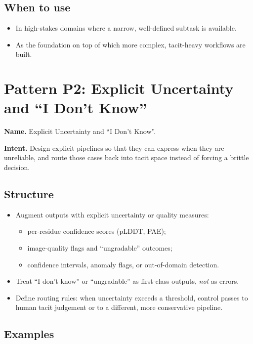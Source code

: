 \subsection*{When to use}

\begin{itemize}
  \item In high-stakes domains where a narrow, well-defined subtask is
        available.
  \item As the foundation on top of which more complex, tacit-heavy
        workflows are built.
\end{itemize}

\section{Pattern P2: Explicit Uncertainty and ``I Don't Know''}
\label{pattern:p2}

\textbf{Name.} Explicit Uncertainty and ``I Don't Know''.

\textbf{Intent.} Design explicit pipelines so that they can express when
they are unreliable, and route those cases back into tacit space instead
of forcing a brittle decision.

\subsection*{Structure}

\begin{itemize}
  \item Augment outputs with explicit uncertainty or quality measures:
        \begin{itemize}
          \item per-residue confidence scores (pLDDT, PAE);
          \item image-quality flags and ``ungradable'' outcomes;
          \item confidence intervals, anomaly flags, or out-of-domain
                detection.
        \end{itemize}
  \item Treat ``I don't know'' or ``ungradable'' as first-class outputs,
        \emph{not} as errors.
  \item Define routing rules:
        when uncertainty exceeds a threshold, control passes to human
        tacit judgement or to a different, more conservative pipeline.
\end{itemize}

\subsection*{Examples}

